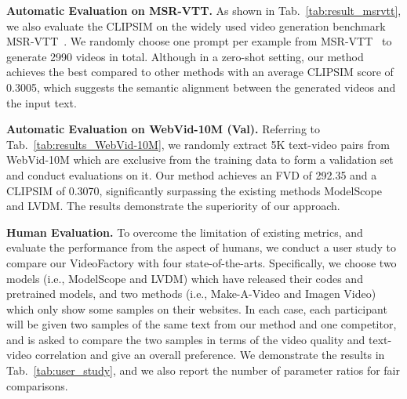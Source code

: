 \documentclass{article}
\begin{document}
\noindent \textbf{Automatic Evaluation on MSR-VTT.} As shown in Tab.~\ref{tab:result_msrvtt}, we also evaluate the CLIPSIM on the widely used video generation benchmark MSR-VTT~\cite{xu2016msr}. We randomly choose one prompt per example from MSR-VTT~\cite{xu2016msr} to generate 2990 videos in total. Although in a zero-shot setting, our method achieves the best compared to other methods with an average CLIPSIM score of 0.3005, which suggests the semantic alignment between the generated videos and the input text.

\noindent \textbf{Automatic Evaluation on WebVid-10M (Val).} 
Referring to Tab.~\ref{tab:results_WebVid-10M}, we randomly extract 5K text-video pairs from WebVid-10M which are exclusive from the training data to form a validation set and conduct evaluations on it.
Our method achieves an FVD of 292.35 and a CLIPSIM of 0.3070, significantly surpassing the existing methods ModelScope and LVDM. The results demonstrate the superiority of our approach.

\noindent \textbf{Human Evaluation.}
To overcome the limitation of existing metrics, and evaluate the performance from the aspect of humans, we conduct a user study to compare our VideoFactory with four state-of-the-arts. Specifically, we choose two models (i.e., ModelScope and LVDM) which have released their codes and pretrained models, and two methods (i.e., Make-A-Video and Imagen Video) which only show some samples on their websites. In each case, each participant will be given two samples of the same text from our method and one competitor, and is asked to compare the two samples in terms of the video quality and text-video correlation and give an overall preference. We demonstrate the results in Tab.~\ref{tab:user_study}, and we also report the number of parameter ratios for fair comparisons.
\end{document}
